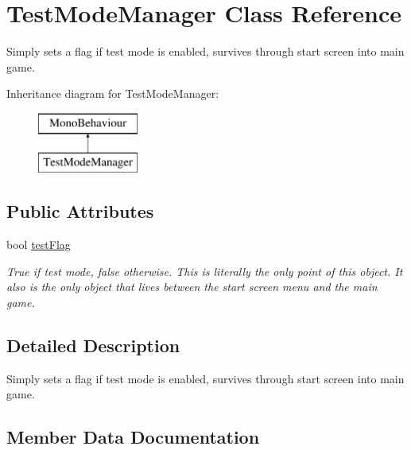\hypertarget{class_test_mode_manager}{}\section{Test\+Mode\+Manager Class Reference}
\label{class_test_mode_manager}


Simply sets a flag if test mode is enabled, survives through start screen into main game.  


Inheritance diagram for Test\+Mode\+Manager\+:\begin{figure}[H]
\begin{center}
\leavevmode
\includegraphics[height=2.000000cm]{class_test_mode_manager}
\end{center}
\end{figure}
\subsection*{Public Attributes}
\begin{DoxyCompactItemize}
\item 
bool \mbox{\hyperlink{class_test_mode_manager_a0aee28083cd1d83acd5f8de6500e660e}{test\+Flag}}
\begin{DoxyCompactList}\small\item\em True if test mode, false otherwise. This is literally the only point of this object. It also is the only object that lives between the start screen menu and the main game. \end{DoxyCompactList}\end{DoxyCompactItemize}


\subsection{Detailed Description}
Simply sets a flag if test mode is enabled, survives through start screen into main game. 

\subsection{Member Data Documentation}
\mbox{\label{class_test_mode_manager_a0aee28083cd1d83acd5f8de6500e660e}} 
